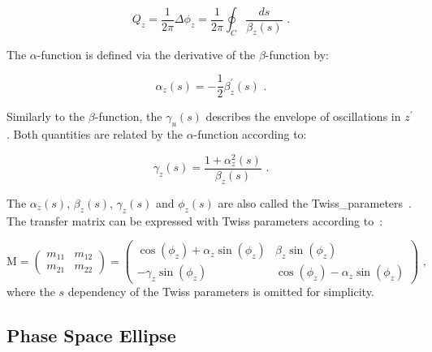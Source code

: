 \begin{equation}
    Q_z = \frac{1}{2 \pi} \Delta \phi_z = \frac{1}{2 \pi} \oint_C \dfrac{ds}{\beta_z (s)} \text{ .}
    \label{equation:tune_definition}
\end{equation}

The \(\alpha\)-function is defined via the derivative of the \(\beta\)-function by:

\begin{equation}
    \alpha_z(s) = - \frac{1}{2} \beta^{\prime}_z(s) \text{ .}
    \label{equation:alpha_function}
\end{equation}

Similarly to the \(\beta\)-function, the  \(\gamma_u(s)\) describes the envelope of oscillations in \(z^{\prime}\).
Both quantities are related by the \(\alpha\)-function according to:

\begin{equation}
    \gamma_z(s) = \frac{1 + \alpha_z^2(s)}{\beta_z(s)} \text{ .}
    \label{equation:gamma_function}
\end{equation}

The \(\alpha_z(s)\), \(\beta_z(s)\), \(\gamma_z(s)\) and \(\phi_z(s)\) are also called the \gls{Twiss_parameters}~\cite{RSI:Twiss:Orbital_Stability_Proton_Synchrotron}.
The transfer matrix can be expressed with Twiss parameters according to~\cite{AOP:COURANT:Theory_Alternating_Gradient_Synchrotron}:

\begin{equation}
    \mathrm{M} = \begin{pmatrix}
        m_{11} & m_{12} \\
        m_{21} & m_{22}
    \end{pmatrix}
    = 
    \begin{pmatrix}
        \cos \left( \phi_z \right) + \alpha_z \sin \left( \phi_z \right)  &  \beta_z \sin \left( \phi_z \right) \\
        - \gamma_z \sin \left( \phi_z \right)                             &  \cos \left( \phi_z \right) - \alpha_z \sin \left( \phi_z \right)
    \end{pmatrix} \text{ ,}
    \label{equation:transfer_matrix_twiss_parameters}
\end{equation}
where the \(s\) dependency of the Twiss parameters is omitted for simplicity.

\subsection{Phase Space Ellipse}
\label{subsection:phase_space_ellipse}

